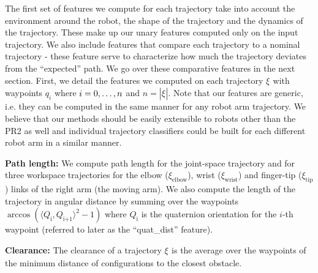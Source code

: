 \documentclass[letterpaper, 10 pt, conference]{ieeeconf}  %
\newcommand{\tj}[1]{\ensuremath{\xi_\text{#1}}}
\begin{document}
The first set of features we compute for each trajectory take into account the environment around the robot, the shape of the trajectory and the dynamics of the trajectory. These make up our unary features computed only on the input trajectory. We also include features that compare each trajectory to a nominal trajectory - these feature serve to characterize how much the trajectory deviates from the ``expected'' path. We go over these comparative features in the next section. First, we detail the features we computed on each trajectory \tj{} with waypoints $q_i$ where $i={0,\mathellipsis,n}$ and $n=|\tj{}|$. Note that our features are generic, i.e. they can be computed in the same manner for any robot arm trajectory. We believe that our methods should be easily extensible to robots other than the PR2 as well and individual trajectory classifiers could be built for each different robot arm in a similar manner.  

{\bf Path length:}
We compute path length for the joint-space trajectory and for three workspace trajectories for the elbow ($\xi_\text{elbow}$), wrist ($\xi_\text{wrist}$) and finger-tip ($\xi_\text{tip}$) links of the right arm (the moving arm). We also compute the length of the trajectory in angular distance by summing over the waypoints $\arccos( \langle Q_\text{i},Q_\text{i+1}\rangle^2-1 )$ where $Q_\text{i}$ is the quaternion orientation for the $i$-th waypoint (referred to later as the ``quat\_dist'' feature).

{\bf Clearance:}
The clearance of a trajectory \tj{} is the average over the waypoints of the minimum distance of configurations to the closest obstacle.
\end{document}
